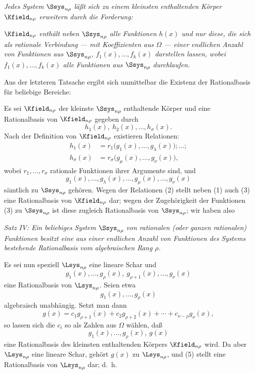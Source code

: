 \documentclass[11pt]{article}
\begin{document}
\emph{Jedes System $\Ssys_{n\rho}$ läßt sich zu einem kleinsten enthaltenden Körper $\Kfield_{n\rho}$ erweitern durch die Forderung:}

\emph{$\Kfield_{n\rho}$ enthält neben $\Ssys_{n\rho}$ alle Funktionen $h(x)$ und nur diese, die sich als rationale Verbindung --- mit Koeffizienten aus $\Omega$ --- einer endlichen Anzahl von Funktionen aus $\Ssys_{n\rho}$, $f_1(x),\ldots,f_k(x)$ darstellen lassen, wobei $f_1(x),\ldots,f_k(x)$ alle Funktionen aus $\Ssys_{n\rho}$ durchlaufen.}

Aus der letzteren Tatsache ergibt sich unmittelbar die Existenz der Rationalbasis für beliebige Bereiche:

Es sei $\Kfield_{n\rho}$ der kleinste $\Ssys_{n\rho}$ enthaltende Körper und eine Rationalbasis von $\Kfield_{n\rho}$ gegeben durch
\begin{equation}
  h_1(x),\ h_2(x),\ldots,h_\sigma(x).
\tag{1}
\end{equation}
Nach der Definition von $\Kfield_{n\rho}$ existieren Relationen:
\begin{equation}
\begin{aligned}
 h_1(x)&=r_1\bigl(g_1(x),\ldots,g_\lambda(x)\bigr);\ldots;\\
 h_\sigma(x)&=r_\sigma\bigl(g_\mu(x),\ldots,g_\nu(x)\bigr),
\end{aligned}
\tag{2}
\end{equation}
wobei $r_1,
\ldots,r_\sigma$ rationale Funktionen ihrer Argumente sind, und
\begin{equation}
  g_1(x),\ldots,g_\lambda(x),\ldots,
  g_\mu(x),\ldots,g_\nu(x)
\tag{3}
\end{equation}
sämtlich zu $\Ssys_{n\rho}$ gehören. Wegen der Relationen (2) stellt neben (1) auch (3) eine Rationalbasis von $\Kfield_{n\rho}$ dar; wegen der Zugehörigkeit der Funktionen (3) zu $\Ssys_{n\rho}$ ist diese zugleich Rationalbasis von $\Ssys_{n\rho}$; wir haben also

\emph{Satz IV: Ein beliebiges System $\Ssys_{n\rho}$ von rationalen (oder ganzen rationalen) Funktionen besitzt eine aus einer endlichen Anzahl von Funktionen des Systems bestehende Rationalbasis vom algebraischen Rang $\rho$.}

Es sei nun speziell $\Lsys_{n\rho}$ eine lineare Schar und
\begin{equation}
  g_1(x),\ldots,g_\rho(x),\ g_{\rho+1}(x),\ldots,g_\nu(x)
\tag{4}
\end{equation}
eine Rationalbasis von $\Lsys_{n\rho}$. Seien etwa
\[
  g_1(x),\ldots,g_\rho(x)
\]
algebraisch unabhängig. Setzt man dann
\[
  g(x)=c_1g_{\rho+1}(x)+c_2g_{\rho+2}(x)+\cdots+c_{\nu-\rho}g_\nu(x),
\]
so lassen sich die $c_i$ so als Zahlen aus $\Omega$ wählen, daß
\begin{equation}
  g_1(x),\ldots,g_\rho(x),\ g(x)
\tag{5}
\end{equation}
eine Rationalbasis des kleinsten enthaltenden Körpers $\Kfield_{n\rho}$ wird. Da aber $\Lsys_{n\rho}$ eine lineare Schar, gehört $g(x)$ zu $\Lsys_{n\rho}$, und (5) stellt eine Rationalbasis von $\Lsys_{n\rho}$ dar; d.~h.
\end{document}
